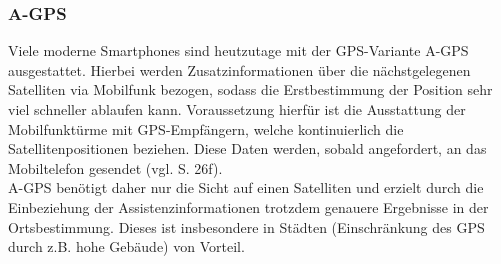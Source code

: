 \subsubsection{\gls{A-GPS}}
Viele moderne \glspl{Smartphone} sind heutzutage mit der \gls{GPS}-Variante \gls{A-GPS} ausgestattet. Hierbei werden Zusatzinformationen über die nächstgelegenen Satelliten via Mobilfunk bezogen, sodass die Erstbestimmung der Position sehr viel schneller ablaufen kann.
Voraussetzung hierfür ist die Ausstattung der Mobilfunktürme mit \gls{GPS}-Empfängern, welche kontinuierlich die Satellitenpositionen beziehen. Diese Daten werden, sobald angefordert, an das Mobiltelefon gesendet (vgl. \cite{gps} S. 26f). \\
\gls{A-GPS} benötigt daher nur die Sicht auf einen Satelliten und erzielt durch die Einbeziehung der Assistenzinformationen trotzdem genauere Ergebnisse in der Ortsbestimmung.
Dieses ist insbesondere in Städten (Einschränkung des \gls{GPS} durch z.B. hohe Gebäude) von Vorteil.
